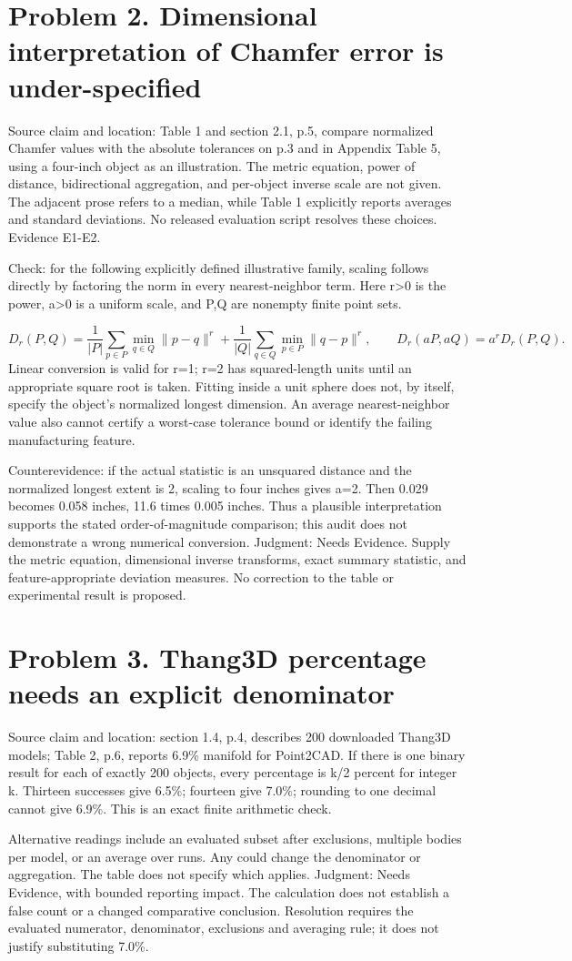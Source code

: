 \documentclass[10pt]{article}
\begin{document}
\section*{Problem 2. Dimensional interpretation of Chamfer error is under-specified}
Source claim and location: Table 1 and section 2.1, p.5, compare normalized Chamfer values with the absolute tolerances on p.3 and in Appendix Table 5, using a four-inch object as an illustration. The metric equation, power of distance, bidirectional aggregation, and per-object inverse scale are not given. The adjacent prose refers to a median, while Table 1 explicitly reports averages and standard deviations. No released evaluation script resolves these choices. Evidence E1-E2.\par
Check: for the following explicitly defined illustrative family, scaling follows directly by factoring the norm in every nearest-neighbor term. Here r>0 is the power, a>0 is a uniform scale, and P,Q are nonempty finite point sets.\par
\[D_r(P,Q)=\frac{1}{|P|}\sum_{p\in P}\min_{q\in Q}\|p-q\|^r+\frac{1}{|Q|}\sum_{q\in Q}\min_{p\in P}\|q-p\|^r,\qquad D_r(aP,aQ)=a^rD_r(P,Q).\] Linear conversion is valid for r=1; r=2 has squared-length units until an appropriate square root is taken. Fitting inside a unit sphere does not, by itself, specify the object’s normalized longest dimension. An average nearest-neighbor value also cannot certify a worst-case tolerance bound or identify the failing manufacturing feature.\par
Counterevidence: if the actual statistic is an unsquared distance and the normalized longest extent is 2, scaling to four inches gives a=2. Then 0.029 becomes 0.058 inches, 11.6 times 0.005 inches. Thus a plausible interpretation supports the stated order-of-magnitude comparison; this audit does not demonstrate a wrong numerical conversion. Judgment: Needs Evidence. Supply the metric equation, dimensional inverse transforms, exact summary statistic, and feature-appropriate deviation measures. No correction to the table or experimental result is proposed.\par
\section*{Problem 3. Thang3D percentage needs an explicit denominator}
Source claim and location: section 1.4, p.4, describes 200 downloaded Thang3D models; Table 2, p.6, reports 6.9\% manifold for Point2CAD. If there is one binary result for each of exactly 200 objects, every percentage is k/2 percent for integer k. Thirteen successes give 6.5\%; fourteen give 7.0\%; rounding to one decimal cannot give 6.9\%. This is an exact finite arithmetic check.\par
Alternative readings include an evaluated subset after exclusions, multiple bodies per model, or an average over runs. Any could change the denominator or aggregation. The table does not specify which applies. Judgment: Needs Evidence, with bounded reporting impact. The calculation does not establish a false count or a changed comparative conclusion. Resolution requires the evaluated numerator, denominator, exclusions and averaging rule; it does not justify substituting 7.0\%.\par
\end{document}
